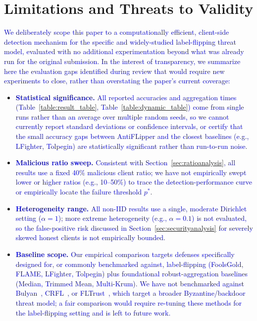 \documentclass[conference]{IEEEtran}
\begin{document}
\section{Limitations and Threats to Validity}
\label{sec:limitations}
\textcolor{blue}{We deliberately scope this paper to a computationally efficient, client-side detection mechanism for the specific and widely-studied label-flipping threat model, evaluated with no additional experimentation beyond what was already run for the original submission. In the interest of transparency, we summarize here the evaluation gaps identified during review that would require new experiments to close, rather than overstating the paper's current coverage:}

\begin{itemize}
    \item \textcolor{blue}{\textbf{Statistical significance.} All reported accuracies and aggregation times (Table~\ref{table:result_table}, Table~\ref{table:dynamic_table}) come from single runs rather than an average over multiple random seeds, so we cannot currently report standard deviations or confidence intervals, or certify that the small accuracy gaps between AntiFLipper and the closest baselines (e.g., LFighter, Tolpegin) are statistically significant rather than run-to-run noise.}
    \item \textcolor{blue}{\textbf{Malicious ratio sweep.} Consistent with Section~\ref{sec:ratioanalysis}, all results use a fixed 40\% malicious client ratio; we have not empirically swept lower or higher ratios (e.g., 10--50\%) to trace the detection-performance curve or empirically locate the failure threshold $p^*$.}
    \item \textcolor{blue}{\textbf{Heterogeneity range.} All non-IID results use a single, moderate Dirichlet setting ($\alpha=1$); more extreme heterogeneity (e.g., $\alpha=0.1$) is not evaluated, so the false-positive risk discussed in Section~\ref{sec:securityanalysis} for severely skewed honest clients is not empirically bounded.}
    \item \textcolor{blue}{\textbf{Baseline scope.} Our empirical comparison targets defenses specifically designed for, or commonly benchmarked against, label-flipping (FoolsGold, FLAME, LFighter, Tolpegin) plus foundational robust-aggregation baselines (Median, Trimmed Mean, Multi-Krum). We have not benchmarked against Bulyan~\cite{mhamdi2018hidden}, CRFL~\cite{xie2021crfl}, or FLTrust~\cite{cao2020fltrust}, which target a broader Byzantine/backdoor threat model; a fair comparison would require re-tuning these methods for the label-flipping setting and is left to future work.}

\end{itemize}
\end{document}
